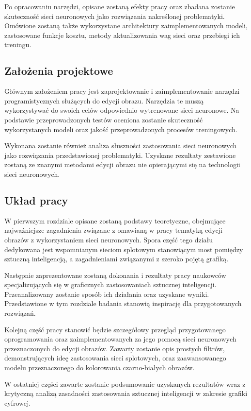     Po opracowaniu narzędzi, opisane zostaną efekty pracy oraz
    zbadana zostanie skuteczność sieci neuronowych jako rozwiązania nakreślonej
    problematyki. Omówione zostaną także wykorzystane architektury zaimplementowanych
    modeli, zastosowane funkcje kosztu, metody aktualizowania wag sieci oraz
    przebiegi ich treningu.

  \subsection{Założenia projektowe}
    Głównym założeniem pracy jest zaprojektowanie i zaimplementowanie
    narzędzi programistycznych służących do edycji obrazu. Narzędzia te muszą
    wykorzystywać do swoich celów odpowiednio wytrenowane sieci neuronowe. Na podstawie
    przeprowadzonych testów oceniona zostanie skuteczność wykorzystanych modeli
    oraz jakość przeprowadzonych procesów treningowych.

    Wykonana zostanie również analiza słuszności zastosowania sieci
    neuronowych jako rozwiązania przedstawionej problematyki. Uzyskane
    rezultaty zestawione zostaną ze znanymi metodami edycji
    obrazu nie opierającymi się na technologii sieci neuronowych.

  \subsection{Układ pracy}
    W pierwszym rozdziale opisane zostaną podstawy teoretyczne, obejmujące najważniejsze
    zagadnienia związane z omawianą w pracy tematyką edycji obrazów z
    wykorzystaniem sieci neuronowych. Spora część tego działu dedykowana jest
    wspomnianym sieciom splotowym stanowiącym most pomiędzy sztuczną inteligencją, a
    zagadnieniami związanymi z szeroko pojętą grafiką.

    Następnie zaprezentowane zostaną dokonania i rezultaty pracy naukowców
    specjalizujących się w graficznych zastosowaniach sztucznej inteligencji.
    Przeanalizowany zostanie sposób ich działania oraz uzyskane wyniki.
    Przedstawione w tym rozdziale badania stanowią inspirację dla przygotowanych
    rozwiązań.

    Kolejną część pracy stanowić będzie szczegółowy przegląd przygotowanego
    oprogramowania oraz zaimplementowanych za jego pomocą sieci neuronowych
    przeznaczonych do edycji obrazów. Zawarty zostanie opis prostych filtrów,
    demonstrujących ideę zastosowania sieci splotowych, oraz zaawansowanego
    modelu przeznaczonego do kolorowania czarno-białych obrazów.

    W ostatniej części zawarte zostanie podsumowanie uzyskanych rezultatów wraz
    z krytyczną analizą zasadności zastosowania sztucznej inteligencji w
    zakresie grafiki cyfrowej.
